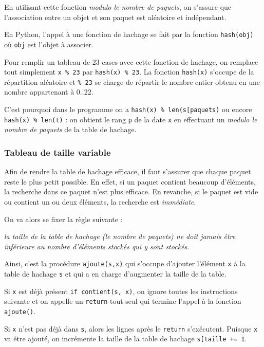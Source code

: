 \documentclass[a4paper,17pt]{extarticle}
\newenvironment{formule}%
{\begin{form}\color{bleuamu}}
{\end{form}}
\begin{document}
En utilisant cette fonction \emph{modulo le nombre de paquets}, on
s'assure que l'association entre un objet et son paquet est aléatoire et
indépendant.

    En Python, l'appel à une fonction de hachage se fait par la fonction
\texttt{hash(obj)} où \texttt{obj} est l'objet à associer.

Pour remplir un tableau de 23 cases avec cette fonction de hachage, on
remplace tout simplement \texttt{x\ \%\ 23} par
\texttt{hash(x)\ \%\ 23}. La fonction \texttt{hash(x)} s'occupe de la
répartition aléatoire et \texttt{\%\ 23} se charge de répartir le nombre
entier obtenu en une nombre appartenant à 0..22.

C'est pourquoi dans le programme on a
\texttt{hash(x)\ \%\ len(s{[}\textquotesingle{}paquets\textquotesingle{}{]})}
ou encore \texttt{hash(x)\ \%\ len(t)} : on obtient le rang \texttt{p}
de la date \texttt{x} en effectuant un \emph{modulo le nombre de
paquets} de la table de hachage.

    \hypertarget{tableau-de-taille-variable}{%
\subsubsection{Tableau de taille
variable}\label{tableau-de-taille-variable}}

    Afin de rendre la table de hachage efficace, il faut s'assurer que
chaque paquet reste le plus petit possible. En effet, si un paquet
contient beaucoup d'éléments, la recherche dans ce paquet n'est plus
efficace. En revanche, si le paquet est vide ou contient un ou deux
éléments, la recherche est \emph{immédiate}.

On va alors se fixer la règle suivante :
\begin{formule}
    \emph{la taille de la table de hachage (le nombre de paquets) ne doit
jamais être inférieure au nombre d'éléments stockés qui y sont stockés}.

        \end{formule}
    Ainsi, c'est la procédure \texttt{ajoute(s,x)} qui s'occupe d'ajouter
l'élément \texttt{x} à la table de hachage \texttt{s} et qui a en charge
d'augmenter la taille de la table.

Si \texttt{x} est déjà présent \texttt{if\ contient(s,\ x)}, on ignore
toutes les instructions suivante et on appelle un \texttt{return} tout
seul qui termine l'appel à la fonction \texttt{ajoute()}.

Si \texttt{x} n'est pas déjà dans \texttt{s}, alors les lignes après le
\texttt{return} s'exécutent. Puisque \texttt{x} va être ajouté, on
incrémente la taille de la table de hachage
\texttt{s{[}\textquotesingle{}taille\textquotesingle{}{]}\ +=\ 1}.
\end{document}
